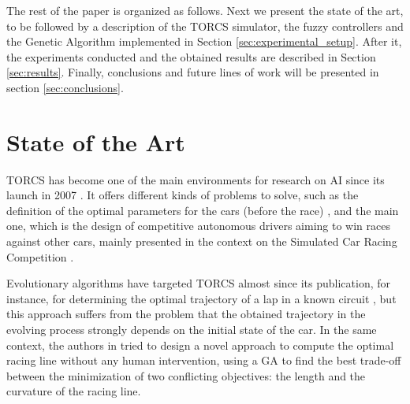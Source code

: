 \documentclass[conference]{IEEEtran}
\begin{document}

The rest of the paper is organized as follows. Next we present the
state of the art, to be followed by a description of the TORCS
simulator, the fuzzy controllers and the Genetic Algorithm implemented in Section \ref{sec:experimental_setup}. After it, the experiments conducted and the obtained results are described in Section \ref{sec:results}. Finally, conclusions and future lines of work will be presented in section \ref{sec:conclusions}.


\section{State of the Art}
\label{sec:soa}

TORCS has become one of the main environments for research on AI since its launch in 2007 \cite{torcs4}. It offers different kinds of problems to solve, such as the definition of the optimal parameters for the cars (before the race) \cite{Kole-ParamCarTunning12}, and the main one, which is the design of competitive autonomous drivers aiming to win races against other cars, mainly presented in the context on the Simulated Car Racing Competition \cite{SimulatedCarRacing-2008,oponnents2010}.

Evolutionary algorithms have targeted TORCS almost since its
publication, for instance, for determining the
optimal trajectory of a lap in a known circuit \cite{drivingGA2008},
but this approach suffers from the problem that the obtained
trajectory in the evolving process strongly depends on the initial
state of the car.  
In the same context, the authors in \cite{GaRaceLine2010} tried to design a novel approach to compute the optimal racing line without any human intervention, using a GA to find the best trade-off between
the minimization of two conflicting objectives: the length and
the curvature of the racing line.
\end{document}
